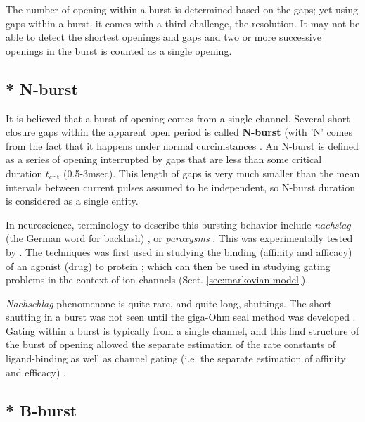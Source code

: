 The number of opening within a burst is determined based on the gaps; yet using
gaps within a burst, it comes with a third challenge, the resolution.
It may not be able to detect the shortest openings and gaps and two or more
successive openings in the burst is counted as a single opening.

\subsection{* N-burst}

It is believed that a burst of opening comes from a single channel.
Several short closure gaps within the apparent open period is called {\bf
N-burst} (with 'N' comes from the fact that it happens under normal
curcimstances \citep{nelson1979, colquhoun1981fmt}. An N-burst is defined as a
series of opening interrupted by gaps that are less than some critical duration
$t_\text{crit}$ (0.5-3msec). This length of gaps is very much smaller than the
mean intervals between current pulses assumed to be independent, so N-burst
duration is considered as a single entity.




\begin{framed}
In neuroscience, terminology to describe this bursting behavior include {\it
nachslag} (the German word for backlash) \citep{colquhoun1981fmt}, or {\it
paroxysms} \citep{montal1984}. This was experimentally tested by
\citep{colquhoun1981fmt, colquhoun1985fes}. The techniques was first used in
studying the binding (affinity and afficacy) of an agonist (drug) to protein
\citep{colquhoun1998bga}; which can then be used in studying gating problems in
the context of ion channels (Sect.
\ref{sec:markovian-model}).

{\it Nachschlag} phenomenone is quite
rare, and quite long, shuttings. The short shutting in a burst was not seen
until the giga-Ohm seal method was developed \citep{hamill1981}. Gating within a
burst is typically from a single channel, and this find structure of the burst
of opening allowed the separate estimation of the rate constants of
ligand-binding as well as channel gating (i.e. the separate estimation of
affinity and efficacy) \citep{colquhoun1998}.
\end{framed}

\subsection{* B-burst}

